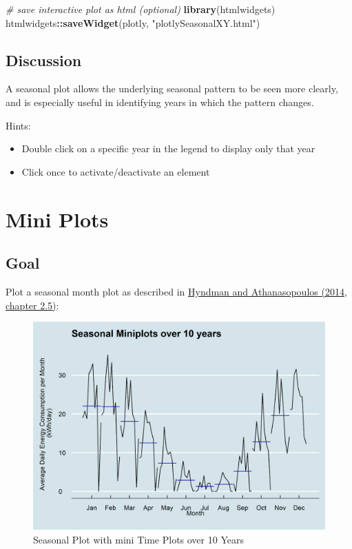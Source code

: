 \documentclass[
  a4paperpaper,
]{book}
\newenvironment{Shaded}{\begin{snugshade}}{\end{snugshade}}
\newcommand{\CommentTok}[1]{\textcolor[rgb]{0.56,0.35,0.01}{\textit{#1}}}
\newcommand{\KeywordTok}[1]{\textcolor[rgb]{0.13,0.29,0.53}{\textbf{#1}}}
\newcommand{\NormalTok}[1]{#1}
\newcommand{\OperatorTok}[1]{\textcolor[rgb]{0.81,0.36,0.00}{\textbf{#1}}}
\newcommand{\StringTok}[1]{\textcolor[rgb]{0.31,0.60,0.02}{#1}}
\providecommand{\tightlist}{%
  \setlength{\itemsep}{0pt}\setlength{\parskip}{0pt}}
\let\oldShaded\Shaded
\let\endoldShaded\endShaded
\renewenvironment{Shaded}{\footnotesize\oldShaded}{\endoldShaded}
\begin{document}
\begin{Shaded}
\begin{Highlighting}[]
\CommentTok{# save interactive plot as html (optional)}
\KeywordTok{library}\NormalTok{(htmlwidgets)}
\NormalTok{htmlwidgets}\OperatorTok{::}\KeywordTok{saveWidget}\NormalTok{(plotly, }\StringTok{"plotlySeasonalXY.html"}\NormalTok{)}
\end{Highlighting}
\end{Shaded}

\hypertarget{discussion-1}{%
\subsection{Discussion}\label{discussion-1}}

A seasonal plot allows the underlying seasonal pattern to be seen more clearly, and is especially useful in identifying years in which the pattern changes.

Hints:

\begin{itemize}
\tightlist
\item
  Double click on a specific year in the legend to display only that year
\item
  Click once to activate/deactivate an element
\end{itemize}

\newpage

\hypertarget{mini-plots}{%
\section{Mini Plots}\label{mini-plots}}

\hypertarget{goal-7}{%
\subsection{Goal}\label{goal-7}}

Plot a seasonal month plot as described in \href{https://otexts.com/fpp2/seasonal-subseries-plots.html}{Hyndman and Athanasopoulos (2014, chapter 2.5)}:

\begin{figure}
\includegraphics[width=0.7\linewidth]{images/plotSeasonalMiniplots} \caption{Seasonal Plot with mini Time Plots over 10 Years}\label{fig:unnamed-chunk-17}
\end{figure}
\end{document}
